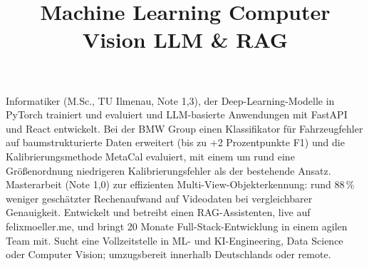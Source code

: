 \documentclass[11pt,a4paper,sans]{moderncv}
\title{Machine Learning \textbullet{} Computer Vision \textbullet{} LLM \& RAG}
\begin{document}
\makecvtitle


\vspace{6pt}
\small{Informatiker (M.Sc., TU Ilmenau, Note 1,3), der Deep-Learning-Modelle in PyTorch trainiert und evaluiert und LLM-basierte Anwendungen mit FastAPI und React entwickelt. Bei der BMW Group einen Klassifikator für Fahrzeugfehler auf baumstrukturierte Daten erweitert (bis zu +2 Prozentpunkte F1) und die Kalibrierungsmethode MetaCal evaluiert, mit einem um rund eine Größenordnung niedrigeren Kalibrierungsfehler als der bestehende Ansatz. Masterarbeit (Note 1,0) zur effizienten Multi-View-Objekterkennung: rund 88\,\% weniger geschätzter Rechenaufwand auf Videodaten bei vergleichbarer Genauigkeit. Entwickelt und betreibt einen RAG-Assistenten, live auf felixmoeller.me, und bringt 20 Monate Full-Stack-Entwicklung in einem agilen Team mit. Sucht eine Vollzeitstelle in ML- und KI-Engineering, Data Science oder Computer Vision; umzugsbereit innerhalb Deutschlands oder remote.}

\end{document}
